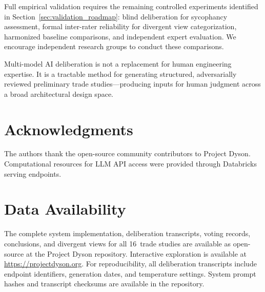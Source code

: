 \documentclass[11pt,a4paper]{article}
\begin{document}
Full empirical validation requires the remaining controlled experiments identified in Section~\ref{sec:validation_roadmap}: blind deliberation for sycophancy assessment, formal inter-rater reliability for divergent view categorization, harmonized baseline comparisons, and independent expert evaluation. We encourage independent research groups to conduct these comparisons.

Multi-model AI deliberation is not a replacement for human engineering expertise. It is a tractable method for generating structured, adversarially reviewed preliminary trade studies---producing inputs for human judgment across a broad architectural design space.

\section*{Acknowledgments}

The authors thank the open-source community contributors to Project Dyson. Computational resources for LLM API access were provided through Databricks serving endpoints.

\section*{Data Availability}

The complete system implementation, deliberation transcripts, voting records, conclusions, and divergent views for all 16~trade studies are available as open-source at the Project Dyson repository. Interactive exploration is available at \url{https://projectdyson.org}. For reproducibility, all deliberation transcripts include endpoint identifiers, generation dates, and temperature settings. System prompt hashes and transcript checksums are available in the repository.
\end{document}
